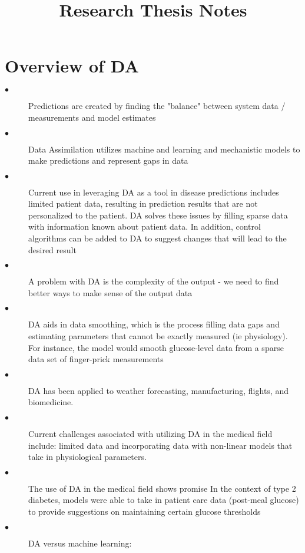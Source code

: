 \documentclass{article}
\title{Research Thesis Notes}
\author{\Name}
\begin{document}
\maketitle

\section{Overview of DA}
\begin{description}
  \item[$\bullet$] Predictions are created by finding the "balance" between system data / measurements and model estimates
  \item[$\bullet$] Data Assimilation  utilizes machine and learning and mechanistic models to make predictions and represent gaps in data \cite{article1}
  \item[$\bullet$] Current use in leveraging DA as a tool in disease predictions includes limited patient data, resulting in prediction results that are not personalized to the patient. DA solves these issues by filling sparse data with information known about patient data. In addition, control algorithms can be added to DA to suggest changes that will lead to the desired result \cite{article1}
  \item[$\bullet$] A problem with DA is the complexity of the output - we need to find better ways to make sense of the output data \cite{article1}
  \item[$\bullet$] DA aids in data smoothing, which is the process filling data gaps and estimating parameters that cannot be exactly measured (ie physiology). For instance, the model would smooth glucose-level data from a sparse data set of finger-prick measurements \cite{article1}
  \item[$\bullet$] DA has been applied to weather forecasting, manufacturing, flights, and biomedicine.
  \item[$\bullet$] Current challenges associated with utilizing DA in the medical field include: limited data and incorporating data with non-linear models that take in physiological parameters. \cite{article1}
  \item[$\bullet$] The use of DA in the medical field shows promise In the context of type 2 diabetes, models were able to take in patient care data (post-meal glucose) to provide suggestions on maintaining certain glucose thresholds \cite{article1}
  \item[$\bullet$] DA versus machine learning:
  \begin{description}[labelindent=1cm]

\end{description}
\end{description}
\end{document}
